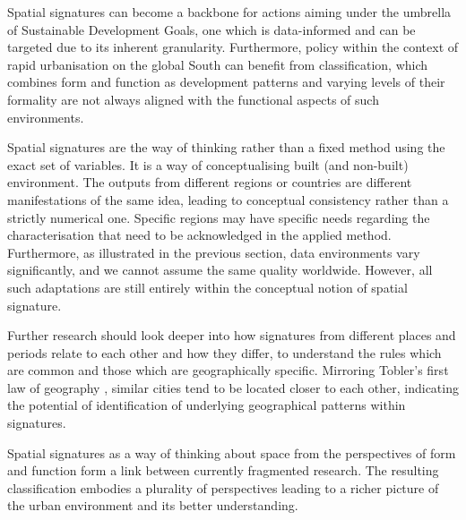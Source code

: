 Spatial signatures can become a backbone for actions aiming under the umbrella of
Sustainable Development Goals, one which is data-informed and can be targeted due to its
inherent granularity. Furthermore, policy within the context of rapid urbanisation on
the global South can benefit from classification, which combines form and function as
development patterns and varying levels of their formality are not always aligned with
the functional aspects of such environments.

Spatial signatures are the way of thinking rather than a fixed method using the exact
set of variables. It is a way of conceptualising built (and non-built) environment. The
outputs from different regions or countries are different manifestations of the same
idea, leading to conceptual consistency rather than a strictly numerical one. Specific
regions may have specific needs regarding the characterisation that need to be
acknowledged in the applied method. Furthermore, as illustrated in the previous section,
data environments vary significantly, and we cannot assume the same quality worldwide.
However, all such adaptations are still entirely within the conceptual notion of spatial
signature.

Further research should look deeper into how signatures from different places and
periods relate to each other and how they differ, to understand the rules which are
common and those which are geographically specific. Mirroring Tobler's first law of
geography \citep{tobler1970computer}, similar cities tend to be located closer to each
other, indicating the potential of identification of underlying geographical patterns
within signatures.

Spatial signatures as a way of thinking about space from the perspectives of form and
function form a link between currently fragmented research. The resulting
classification embodies a plurality of perspectives leading to a richer picture of the
urban environment and its better understanding.

